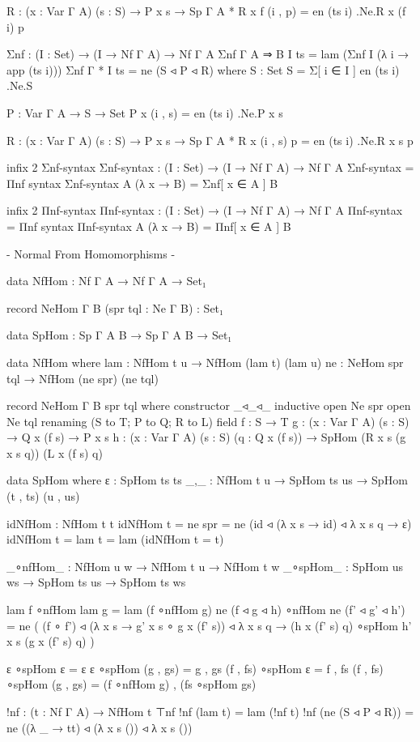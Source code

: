 \begin{code}
  R : (x : Var Γ A) (s : S) → P x s → Sp Γ A *
  R x f (i , p) = en (ts i) .Ne.R x (f i) p

Σnf : (I : Set) → (I → Nf Γ A) → Nf Γ A
Σnf {Γ} {A ⇒ B} I ts = lam (Σnf I (λ i → app (ts i)))
Σnf {Γ} {*} I ts = ne (S ◃ P ◃ R)
  where
  S : Set
  S = Σ[ i ∈ I ] en (ts i) .Ne.S

  P : Var Γ A → S → Set
  P x (i , s) = en (ts i) .Ne.P x s

  R : (x : Var Γ A) (s : S) → P x s → Sp Γ A *
  R x (i , s) p = en (ts i) .Ne.R x s p

infix 2 Σnf-syntax
Σnf-syntax : (I : Set) → (I → Nf Γ A) → Nf Γ A
Σnf-syntax = Πnf
syntax Σnf-syntax A (λ x → B) = Σnf[ x ∈ A ] B

infix 2 Πnf-syntax
Πnf-syntax : (I : Set) → (I → Nf Γ A) → Nf Γ A
Πnf-syntax = Πnf
syntax Πnf-syntax A (λ x → B) = Πnf[ x ∈ A ] B

{- Normal From Homomorphisms -}

data NfHom : Nf Γ A → Nf Γ A → Set₁

record NeHom {Γ} {B} (spr tql : Ne Γ B) : Set₁

data SpHom : Sp Γ A B → Sp Γ A B → Set₁

data NfHom where
  lam : NfHom t u → NfHom (lam t) (lam u)
  ne  : NeHom spr tql → NfHom (ne spr) (ne tql)

record NeHom {Γ} {B} spr tql where
  constructor _◃_◃_
  inductive
  open Ne spr
  open Ne tql renaming (S to T; P to Q; R to L)
  field
    f : S → T
    g : (x : Var Γ A) (s : S) → Q x (f s) → P x s
    h : (x : Var Γ A) (s : S) (q : Q x (f s))
      → SpHom (R x s (g x s q)) (L x (f s) q)
       
data SpHom where
  ε   : SpHom ts ts
  _,_ : NfHom t u → SpHom ts us → SpHom (t , ts) (u , us)

idNfHom : NfHom t t
idNfHom {t = ne spr} = ne (id ◃ (λ x s → id) ◃ λ x s q → ε)
idNfHom {t = lam t} = lam (idNfHom {t = t})

_∘nfHom_ : NfHom u w → NfHom t u → NfHom t w
_∘spHom_ : SpHom us ws → SpHom ts us → SpHom ts ws

lam f ∘nfHom lam g = lam (f ∘nfHom g)
ne (f ◃ g ◃ h) ∘nfHom ne (f' ◃ g' ◃ h') = ne (
  (f ∘ f')
  ◃ (λ x s → g' x s ∘ g x (f' s))
  ◃ λ x s q → (h x (f' s) q) ∘spHom h' x s (g x (f' s) q)
  )

ε ∘spHom ε = ε
ε ∘spHom (g , gs) = g , gs
(f , fs) ∘spHom ε = f , fs
(f , fs) ∘spHom (g , gs) = (f ∘nfHom g) , (fs ∘spHom gs)


!nf : (t : Nf Γ A) → NfHom t ⊤nf
!nf (lam t) = lam (!nf t)
!nf (ne (S ◃ P ◃ R)) = ne ((λ _ → tt) ◃ (λ x s ()) ◃ λ x s ())


\end{code}
